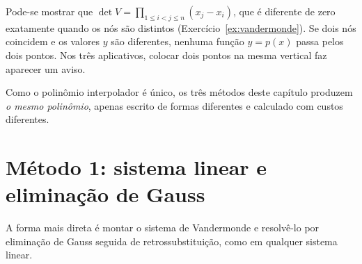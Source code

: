 \begin{observacao}
Pode-se mostrar que $\det V=\displaystyle\prod_{1\le i<j\le n}(x_j-x_i)$, que é diferente
de zero exatamente quando os nós são distintos (Exercício~\ref{ex:vandermonde}).
Se dois nós coincidem e os valores $y$ são diferentes, nenhuma função $y=p(x)$ passa pelos
dois pontos. Nos três aplicativos, colocar dois pontos na mesma vertical faz aparecer um aviso.
\end{observacao}

Como o polinômio interpolador é único, os três métodos deste capítulo produzem
\emph{o mesmo polinômio}, apenas escrito de formas diferentes e calculado com custos
diferentes.

\section{Método 1: sistema linear e eliminação de Gauss}

A forma mais direta é montar o sistema de Vandermonde e resolvê-lo por eliminação de Gauss
seguida de retrossubstituição, como em qualquer sistema linear.

